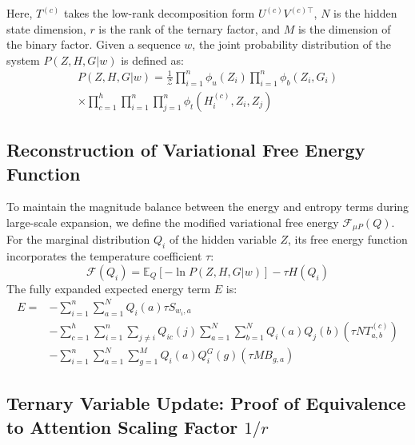 \documentclass[11pt]{article}
\begin{document}
Here, $T^{(c)}$ takes the low-rank decomposition form $U^{(c)}V^{(c)\top}$, $N$ is the hidden state dimension, $r$ is the rank of the ternary factor, and $M$ is the dimension of the binary factor. Given a sequence $w$, the joint probability distribution of the system $P(Z, H, G|w)$ is defined as:
\begin{equation}
\begin{split}
P(Z, H, G|w) = \frac{1}{\mathcal{Z}} \prod_{i=1}^n \phi_u(Z_i) \prod_{i=1}^n \phi_b(Z_i, G_i) \\
\times \prod_{c=1}^h \prod_{i=1}^n \prod_{j=1}^n \phi_t(H_i^{(c)}, Z_i, Z_j)
\end{split}
\end{equation}

\subsection{Reconstruction of Variational Free Energy Function}

To maintain the magnitude balance between the energy and entropy terms during large-scale expansion, we define the modified variational free energy $\mathcal{F}_{\mu P}(Q)$. For the marginal distribution $Q_i$ of the hidden variable $Z$, its free energy function incorporates the temperature coefficient $\tau$:
\begin{equation}
\mathcal{F}(Q_i) = \mathbb{E}_Q[-\ln P(Z, H, G|w)] - \tau H(Q_i)
\end{equation}
The fully expanded expected energy term $E$ is:
\begin{equation}
\begin{aligned} E = &-\sum_{i=1}^n \sum_{a=1}^N Q_i(a) \tau S_{w_i,a} \\ &-\sum_{c=1}^h \sum_{i=1}^n \sum_{j \neq i} Q_{ic}(j) \sum_{a=1}^N \sum_{b=1}^N Q_i(a) Q_j(b) (\tau N T_{a,b}^{(c)}) \\ &-\sum_{i=1}^n \sum_{a=1}^N \sum_{g=1}^M Q_i(a) Q_i^G(g) (\tau M B_{g,a}) \end{aligned}
\end{equation}

\subsection{Ternary Variable Update: Proof of Equivalence to Attention Scaling Factor $1/r$}
\end{document}
